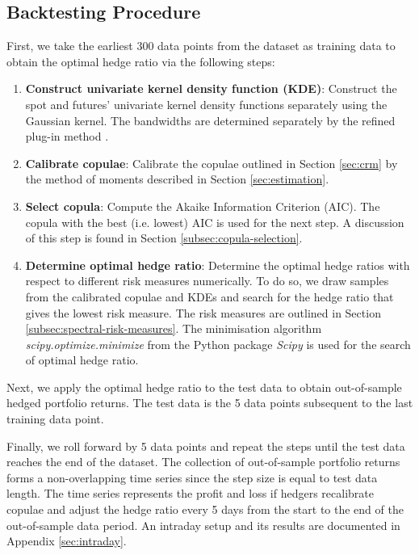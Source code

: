 \subsection{Backtesting Procedure}\label{sec:empirical-procedure}
First, we take the earliest 300 data points from the dataset 
as training data to obtain the optimal hedge ratio via the following steps:

\begin{enumerate}
\item \textbf{Construct univariate kernel density function (KDE)}:
  Construct the spot and futures' univariate kernel density functions separately
  using the Gaussian kernel. The bandwidths are determined separately by the refined plug-in method \citep[Section
  3.3.3]{hardle2004nonparametric}.
\item \textbf{Calibrate copulae}:
  Calibrate the copulae outlined in Section \ref{sec:crm} by the
  method of moments described in Section \ref{sec:estimation}.
\item \textbf{Select copula}:
  Compute the Akaike Information Criterion (AIC). The copula with the
  best (i.e. lowest) AIC is used for the next step. 
  A discussion of this step is found in Section \ref{subsec:copula-selection}.
\item \textbf{Determine optimal hedge ratio}:
  Determine the optimal hedge ratios with respect to different
  risk measures numerically. 
  To do so, we draw samples from the calibrated copulae and KDEs 
  and search for the hedge ratio that gives the lowest risk measure. 
  The risk measures are outlined in Section \ref{subsec:spectral-risk-measures}.
  The minimisation algorithm \textit{scipy.optimize.minimize} from the Python package {\em Scipy} \citep{2020SciPy-NMeth} is used for the search of optimal hedge ratio.
\end{enumerate}

Next, we apply the optimal hedge ratio to the test data to obtain out-of-sample hedged portfolio returns.
The test data is the 5 data points subsequent to the last training data point. 

Finally, we roll forward by 5 data points and repeat the steps until the test data reaches the end of the dataset. 
The collection of out-of-sample portfolio returns forms a non-overlapping time series since the step size is equal to test data length.
The time series represents the profit and loss if hedgers recalibrate copulae and adjust the hedge ratio every 5 days from the start to the end of the out-of-sample data period.
An intraday setup and its results are documented in Appendix \ref{sec:intraday}. 

